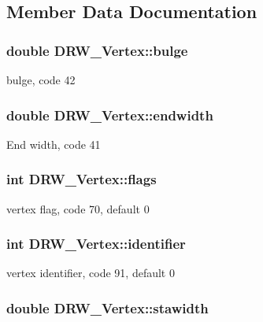 \subsection{Member Data Documentation}
\hypertarget{classDRW__Vertex_ace756c96a4ff61eb15e7e1327d7fc56d}{
\subsubsection[{bulge}]{\setlength{\rightskip}{0pt plus 5cm}double D\-R\-W\-\_\-\-Vertex\-::bulge}}\label{classDRW__Vertex_ace756c96a4ff61eb15e7e1327d7fc56d}
bulge, code 42 \hypertarget{classDRW__Vertex_a707f8fca7c9df740d9a13b1328c05d06}{
\subsubsection[{endwidth}]{\setlength{\rightskip}{0pt plus 5cm}double D\-R\-W\-\_\-\-Vertex\-::endwidth}}\label{classDRW__Vertex_a707f8fca7c9df740d9a13b1328c05d06}
End width, code 41 \hypertarget{classDRW__Vertex_a662134a0aaac672cbb37c741e872ce3a}{
\subsubsection[{flags}]{\setlength{\rightskip}{0pt plus 5cm}int D\-R\-W\-\_\-\-Vertex\-::flags}}\label{classDRW__Vertex_a662134a0aaac672cbb37c741e872ce3a}
vertex flag, code 70, default 0 \hypertarget{classDRW__Vertex_a14a4b517273a6c76a5b905eb691d5193}{
\subsubsection[{identifier}]{\setlength{\rightskip}{0pt plus 5cm}int D\-R\-W\-\_\-\-Vertex\-::identifier}}\label{classDRW__Vertex_a14a4b517273a6c76a5b905eb691d5193}
vertex identifier, code 91, default 0 \hypertarget{classDRW__Vertex_a59c2c6a18ec24afdec344b187cb89e02}{
\subsubsection[{stawidth}]{\setlength{\rightskip}{0pt plus 5cm}double D\-R\-W\-\_\-\-Vertex\-::stawidth}}\label{classDRW__Vertex_a59c2c6a18ec24afdec344b187cb89e02}
